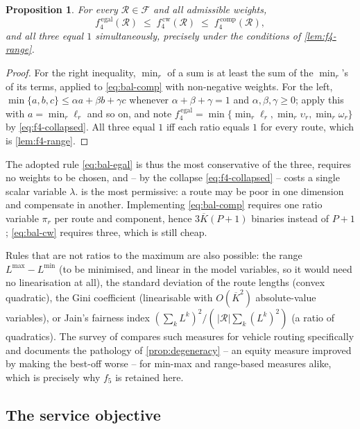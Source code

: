 \documentclass[11pt,a4paper]{article}
\theoremstyle{definition}
\theoremstyle{plain}
\newtheorem{proposition}[definition]{Proposition}
\newcommand{\Feas}{\mathcal{F}}
\newcommand{\Routes}{\mathcal{R}}
\newcommand{\Lmax}{L^{\max}}
\begin{document}
\begin{proposition}
\label{prop:bal-order}
For every $\Routes \in \Feas$ and all admissible weights,
\begin{equation}
  f_4^{\,\mathrm{egal}}(\Routes)
  \;\le\; f_4^{\,\mathrm{cw}}(\Routes)
  \;\le\; f_4^{\,\mathrm{comp}}(\Routes),
\end{equation}
and all three equal $1$ simultaneously, precisely under the conditions of
\cref{lem:f4-range}.
\end{proposition}

\begin{proof}
For the right inequality, $\min_r$ of a sum is at least the sum of the
$\min_r$'s of its terms, applied to \eqref{eq:bal-comp} with non-negative
weights.  For the left, $\min\{a,b,c\} \le \alpha a + \beta b + \gamma c$
whenever $\alpha+\beta+\gamma=1$ and $\alpha,\beta,\gamma \ge 0$; apply this
with $a = \min_r \ell_r$ and so on, and note
$f_4^{\,\mathrm{egal}} = \min\{\min_r \ell_r, \min_r \upsilon_r,
\min_r \omega_r\}$ by \eqref{eq:f4-collapsed}.  All three equal $1$ iff each
ratio equals $1$ for every route, which is \cref{lem:f4-range}.
\end{proof}

The adopted rule \eqref{eq:bal-egal} is thus the most conservative of the
three, requires no weights to be chosen, and -- by the collapse
\eqref{eq:f4-collapsed} -- costs a single scalar variable $\lambda$.
 is the most permissive: a route may be poor in one
dimension and compensate in another.  Implementing \eqref{eq:bal-comp} requires
one ratio variable $\pi_r$ per route and component, hence
$3\overline{K}(P+1)$ binaries instead of $P+1$; \eqref{eq:bal-cw} requires
three, which is still cheap.

Rules that are not ratios to the maximum are also possible: the range
$\Lmax - L^{\min}$ (to be minimised, and linear in the model variables, so it
would need no linearisation at all), the standard deviation of the route
lengths (convex quadratic), the Gini coefficient (linearisable with
$O(\overline{K}^2)$ absolute-value variables), or Jain's fairness index
$(\sum_k L^k)^2 / (\,|\Routes| \sum_k (L^k)^2)$ (a ratio of quadratics).  The
survey of \cite{Matl2018} compares such measures for vehicle routing
specifically and documents the pathology of \cref{prop:degeneracy} -- an equity
measure improved by making the best-off worse -- for min-max and range-based
measures alike, which is precisely why $f_5$ is retained here.

\subsection{The service objective}
\label{sec:alt-f1}
\end{document}
